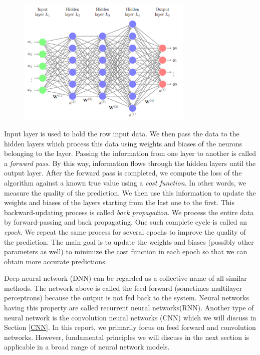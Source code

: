 \documentclass[12pt]{article}
\begin{document}
\begin{figure}[H]
  \centering
  \includegraphics[width=0.75\textwidth]{network.png}
  \label{fig:nnpic}
\end{figure}


Input layer is used to hold the row input data. We then pass the data to the hidden layers which process this data using weights and biases of the neurons belonging to the layer. Passing the information from one layer to another is called a \textit{forward pass}. By this way, information flows through the hidden layers until the output layer. After the forward pass is completed, we compute the loss of the algorithm against a known true value using a \textit{cost function}. In other words, we measure the quality of the prediction. We then use this information to update the weights and biases of the layers starting from the last one to the first. This backward-updating process is called \textit{back propagation}. 
We process the entire data by forward-passing and back propagating. One such complete cycle is called an \textit{epoch}. We repeat the same process for several epochs to improve the quality of the prediction. The main goal is to update the weights and biases (possibly other parameters as well) to minimize the cost function in each epoch so that we can obtain more accurate predictions.

Deep neural network (DNN) can be regarded as a collective name of all similar methods. The network above is called the feed forward (sometimes multilayer perceptrons) because the output is not fed back to the system. Neural networks having this property are called recurrent neural networks(RNN). Another type of neural network is the convolution neural networks (CNN) which we will discuss in Section \ref{CNN}. In this report, we primarily focus on feed forward and convolution networks. However, fundamental principles we will discuss in the next section is applicable in a broad range of neural network models.   
 
\end{document}
